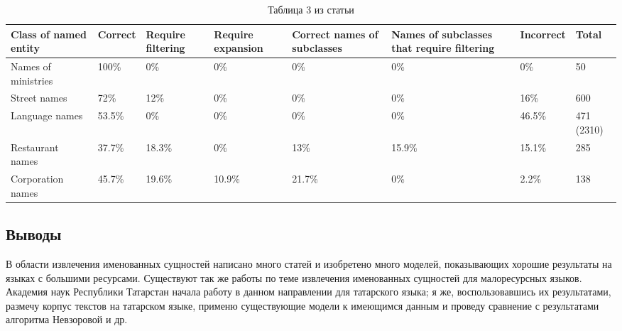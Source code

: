 \begin{enumerate}
\end{enumerate}


\begin{table}[h!]
 \begin{tabular}[h]{m{2.2cm}m{1.7cm}m{1.7cm}m{1.8cm}m{1.9cm}m{1.9cm}m{1.7cm}m{1.7cm}}

\hline
\hline
Class of named entity  & Correct & Require filtering & Require expansion & Correct names of subclasses & Names of subclasses that require filtering & Incorrect & Total \\
\hline
 Names of ministries & 100\% & 0\% & 0\% & 0\% & 0\% & 0\% & 50 \\
 \hline
 Street names & 72\% & 12\% & 0\% & 0\% & 0\% & 16\% & 600 \\
 \hline
 Language names & 53.5\% & 0\% & 0\% & 0\% & 0\% & 46.5\% & 471 (2310) \\
 \hline
 Restaurant names & 37.7\% & 18.3\% & 0\% & 13\% & 15.9\% & 15.1\% & 285 \\
 \hline
 Corporation names & 45.7\% & 19.6\% & 10.9\% & 21.7\% & 0\% & 2.2\% & 138 \\
\hline
\hline
\end{tabular}
\caption{Таблица 3 из статьи \cite{Nevzorova}}
\label{table:Nevzorova}
\end{table}

\subsection{Выводы}

В области извлечения именованных сущностей написано много статей и изобретено много моделей, показывающих хорошие результаты на языках с большими ресурсами. Существуют так же работы по теме извлечения именованных сущностей для малоресурсных языков. Академия наук Республики Татарстан начала работу в данном направлении для татарского языка; я же, воспользовавшись их результатами, размечу корпус текстов на татарском языке, применю существующие модели к имеющимся данным и проведу сравнение с результатами алгоритма Невзоровой и др.



























